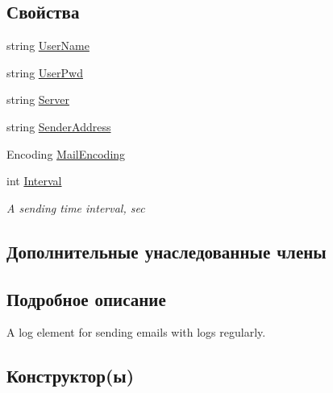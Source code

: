 \subsection*{Свойства}
\begin{DoxyCompactItemize}
\item 
string \hyperlink{class_logger_1_1_mail_log_element_a1c27d48ed2179c762fcfa529c09ca2c4}{User\+Name}
\item 
string \hyperlink{class_logger_1_1_mail_log_element_a43af5a71bdf3356961fba873d781a401}{User\+Pwd}
\item 
string \hyperlink{class_logger_1_1_mail_log_element_a905858500657e80ffed3da8027ff61b0}{Server}
\item 
string \hyperlink{class_logger_1_1_mail_log_element_ad31367eb4d1cbbf2dc72cd6ea9931b96}{Sender\+Address}
\item 
Encoding \hyperlink{class_logger_1_1_mail_log_element_a9cf2183282166c47d8641208e5bd9a5a}{Mail\+Encoding}
\item 
int \hyperlink{class_logger_1_1_mail_log_element_a9e0ae290ef81208b6578da0ec0dcc2af}{Interval}
\begin{DoxyCompactList}\small\item\em A sending time interval, sec \end{DoxyCompactList}\end{DoxyCompactItemize}
\subsection*{Дополнительные унаследованные члены}


\subsection{Подробное описание}
A log element for sending emails with logs regularly. 



\subsection{Конструктор(ы)}
\hypertarget{class_logger_1_1_mail_log_element_a5ea3bef606bb2d0d180b8f474b903607}{}
